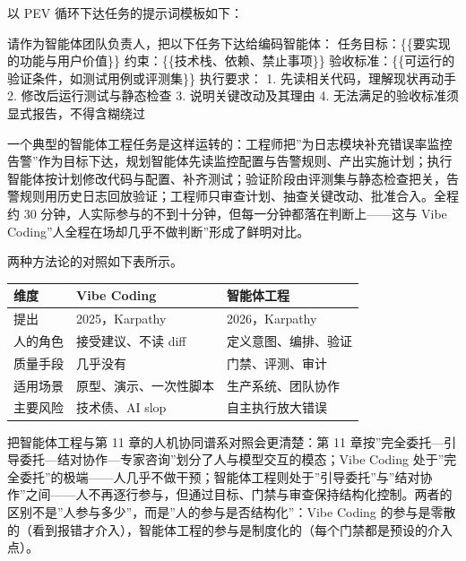 \documentclass[
]{ctexbook}
\newenvironment{Shaded}{
  \ttfamily\small
}{}
\newcommand{\NormalTok}[1]{#1}
\newcounter{none}
\begin{document}
以 PEV 循环下达任务的提示词模板如下：

\begin{Shaded}
\begin{Highlighting}[]
\NormalTok{请作为智能体团队负责人，把以下任务下达给编码智能体：}
\NormalTok{任务目标：\{\{要实现的功能与用户价值\}\}}
\NormalTok{约束：\{\{技术栈、依赖、禁止事项\}\}}
\NormalTok{验收标准：\{\{可运行的验证条件，如测试用例或评测集\}\}}
\NormalTok{执行要求：}
\NormalTok{1. 先读相关代码，理解现状再动手}
\NormalTok{2. 修改后运行测试与静态检查}
\NormalTok{3. 说明关键改动及其理由}
\NormalTok{4. 无法满足的验收标准须显式报告，不得含糊绕过}
\end{Highlighting}
\end{Shaded}

一个典型的智能体工程任务是这样运转的：工程师把''为日志模块补充错误率监控告警''作为目标下达，规划智能体先读监控配置与告警规则、产出实施计划；执行智能体按计划修改代码与配置、补齐测试；验证阶段由评测集与静态检查把关，告警规则用历史日志回放验证；工程师只审查计划、抽查关键改动、批准合入。全程约
30 分钟，人实际参与的不到十分钟，但每一分钟都落在判断上------这与 Vibe
Coding''人全程在场却几乎不做判断''形成了鲜明对比。

两种方法论的对照如下表所示。

{\def\LTcaptype{none} %
\begin{longtable}[]{@{}lll@{}}
\toprule\noalign{}
维度 & Vibe Coding & 智能体工程 \\
\midrule\noalign{}
\endhead
\bottomrule\noalign{}
\endlastfoot
提出 & 2025，Karpathy & 2026，Karpathy \\
人的角色 & 接受建议、不读 diff & 定义意图、编排、验证 \\
质量手段 & 几乎没有 & 门禁、评测、审计 \\
适用场景 & 原型、演示、一次性脚本 & 生产系统、团队协作 \\
主要风险 & 技术债、AI slop & 自主执行放大错误 \\
\end{longtable}
}

把智能体工程与第 11 章的人机协同谱系对照会更清楚：第 11
章按''完全委托---引导委托---结对协作---专家咨询''划分了人与模型交互的模态；Vibe
Coding
处于''完全委托''的极端------人几乎不做干预；智能体工程则处于''引导委托''与''结对协作''之间------人不再逐行参与，但通过目标、门禁与审查保持结构化控制。两者的区别不是''人参与多少''，而是''人的参与是否结构化''：Vibe
Coding
的参与是零散的（看到报错才介入），智能体工程的参与是制度化的（每个门禁都是预设的介入点）。
\end{document}
